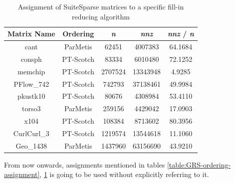 \begin{table}[htpb]
\centering
\begin{tabular}{|c|c|c|c|c|}
\hline
Matrix Name & Ordering  & \textit{n}       & \textit{nnz}      & \textit{nnz} / \textit{n} \\ \hline
cant        & ParMetis  & 62451   & 4007383  & 64.1684 \\ \hline
consph      & PT-Scotch & 83334   & 6010480  & 72.1252 \\ \hline
memchip     & PT-Scotch & 2707524 & 13343948 & 4.9285  \\ \hline
PFlow\_742  & PT-Scotch & 742793  & 37138461 & 49.9984 \\ \hline
pkustk10    & PT-Scotch & 80676   & 4308984  & 53.4110 \\ \hline
torso3      & ParMetis  & 259156  & 4429042  & 17.0903 \\ \hline
x104        & PT-Scotch & 108384  & 8713602  & 80.3956 \\ \hline
CurlCurl\_3 & PT-Scotch & 1219574 & 13544618 & 11.1060 \\ \hline
Geo\_1438   & ParMetis  & 1437960 & 63156690 & 43.9210 \\ \hline
\end{tabular}
\caption{Assignment of SuiteSparse matrices to a specific fill-in reducing algorithm}
\label{table:SuiteSparse-ordering-assignment}
\end{table}


From now onwards, assignments mentioned in tables \ref{table:GRS-ordering-assignment}, \ref{table:SuiteSparse-ordering-assignment} is going to be used without explicitly referring to it.\\
